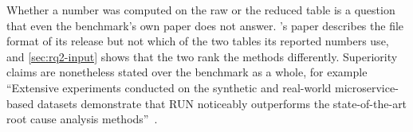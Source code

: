 Whether a number was computed on the raw or the reduced table is a question that even the benchmark's own paper does not answer.
\rcaeval's paper describes the file format of its release but not which of the two tables its reported numbers use, and \cref{sec:rq2-input} shows that the two rank the methods differently.
Superiority claims are nonetheless stated over the benchmark as a whole, for example ``Extensive experiments conducted on the synthetic and real-world microservice-based datasets demonstrate that RUN noticeably outperforms the state-of-the-art root cause analysis methods''~\citep{lin2024run}.
